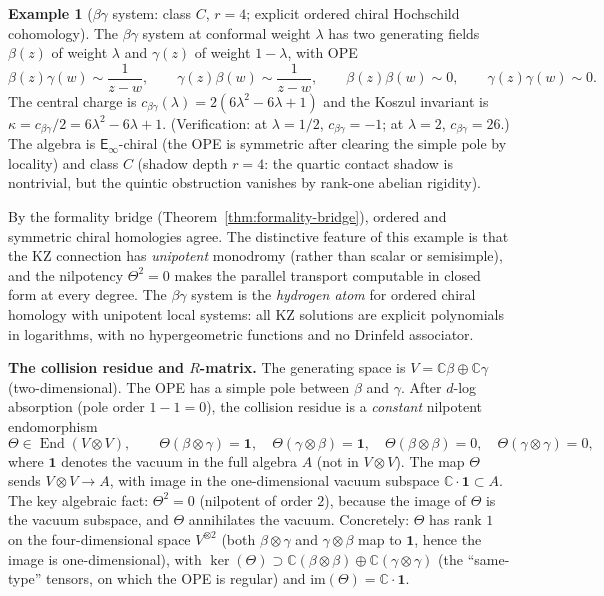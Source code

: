 \documentclass[11pt,reqno]{amsart}
\theoremstyle{definition}
\newtheorem{example}[theorem]{Example}
\theoremstyle{remark}
\newcommand{\Einf}{\mathsf{E}_{\infty}}
\DeclareMathOperator{\End}{End}
\newcommand{\CC}{\mathbb{C}}
\numberwithin{equation}{section}
\begin{document}
\begin{example}[$\beta\gamma$ system: class $C$, $r = 4$;
explicit ordered chiral Hochschild cohomology]
\label{ex:betagamma}
The $\beta\gamma$ system at conformal weight $\lambda$ has two
generating fields $\beta(z)$ of weight $\lambda$ and $\gamma(z)$
of weight $1 - \lambda$, with OPE
\[
\beta(z)\gamma(w) \sim \frac{1}{z - w}, \qquad
\gamma(z)\beta(w) \sim \frac{1}{z - w}, \qquad
\beta(z)\beta(w) \sim 0, \qquad
\gamma(z)\gamma(w) \sim 0.
\]
The central charge is $c_{\beta\gamma}(\lambda)
= 2(6\lambda^2 - 6\lambda + 1)$ and the Koszul invariant is
$\kappa = c_{\beta\gamma}/2 = 6\lambda^2 - 6\lambda + 1$.
(Verification: at $\lambda = 1/2$, $c_{\beta\gamma} = -1$;
at $\lambda = 2$, $c_{\beta\gamma} = 26$.)
The algebra is $\Einf$-chiral (the OPE is symmetric after
clearing the simple pole by locality) and class $C$ (shadow
depth $r = 4$: the quartic contact shadow is nontrivial,
but the quintic obstruction vanishes by rank-one abelian
rigidity).

By the formality bridge (Theorem~\ref{thm:formality-bridge}),
ordered and symmetric chiral homologies agree.
The distinctive feature of this example is that the KZ connection has
\emph{unipotent} monodromy (rather than scalar or semisimple),
and the nilpotency $\Theta^2 = 0$ makes the parallel transport
computable in closed form at every degree.
The $\beta\gamma$ system is the \emph{hydrogen atom} for
ordered chiral homology with unipotent local systems: all KZ
solutions are explicit polynomials in logarithms, with no
hypergeometric functions and no Drinfeld associator.

\medskip
\noindent
\textbf{The collision residue and $R$-matrix.}
The generating space is $V = \CC\beta \oplus \CC\gamma$
(two-dimensional). The OPE has a simple pole between $\beta$
and $\gamma$. After $d$-log absorption (pole order $1 - 1 = 0$),
the collision residue is a \emph{constant} nilpotent endomorphism
\begin{equation}\label{eq:bg-theta}
  \Theta \in \End(V \otimes V), \qquad
  \Theta(\beta \otimes \gamma) = \mathbf{1}, \quad
  \Theta(\gamma \otimes \beta) = \mathbf{1}, \quad
  \Theta(\beta \otimes \beta) = 0, \quad
  \Theta(\gamma \otimes \gamma) = 0,
\end{equation}
where $\mathbf{1}$ denotes the vacuum in the full algebra $A$
(not in $V \otimes V$). The map $\Theta$ sends
$V \otimes V \to A$, with image in the one-dimensional
vacuum subspace $\CC \cdot \mathbf{1} \subset A$.
The key algebraic fact:
$\Theta^2 = 0$ (nilpotent of order $2$), because the image
of $\Theta$ is the vacuum subspace, and
$\Theta$ annihilates the vacuum. Concretely: $\Theta$ has
rank $1$ on the four-dimensional space $V^{\otimes 2}$
(both $\beta \otimes \gamma$ and $\gamma \otimes \beta$
map to $\mathbf{1}$, hence the image is one-dimensional),
with
$\ker(\Theta) \supset \CC(\beta \otimes \beta)
\oplus \CC(\gamma \otimes \gamma)$
(the ``same-type'' tensors, on which the OPE is regular)
and $\mathrm{im}(\Theta) = \CC \cdot \mathbf{1}$.


\end{example}
\end{document}

